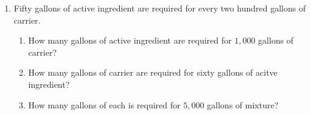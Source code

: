 \documentclass[12pt]{article}
\begin{document}
\begin{enumerate}
\item Fifty gallons of active ingredient are required for every two hundred gallons of carrier. 
	\begin{enumerate}
		\item How many gallons of active ingredient are required for $1,000$ gallons of carrier? 
  \vspace{0.5in}
		\item How many gallons of carrier are required for sixty gallons of acitve ingredient?  
  \vspace{0.5in}
		\item How many gallons of each is required for $5,000$ gallons of mixture? 
  \vspace{0.5in}
	\end{enumerate}

\end{enumerate}
\end{document}
